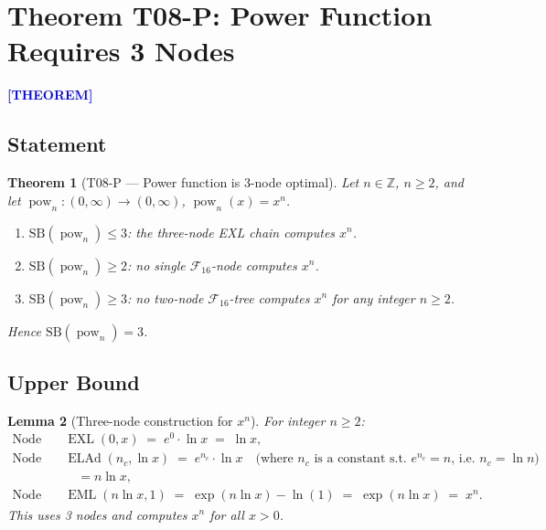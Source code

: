 \documentclass[12pt,a4paper]{article}
\newtheorem{theorem}{Theorem}[section]
\newtheorem{lemma}[theorem]{Lemma}
\theoremstyle{definition}
\newcommand{\EML}{\operatorname{EML}}
\newcommand{\EXL}{\operatorname{EXL}}
\newcommand{\ELAd}{\operatorname{ELAd}}
\newcommand{\prooflabel}[1]{%
  \noindent\textbf{\textcolor{blue}{[#1]}}%
}
\newcommand{\F}{\mathcal{F}_{16}}
\newcommand{\SB}{\mathrm{SB}}
\newcommand{\pow}{\operatorname{pow}}
\begin{document}
\section{\texorpdfstring{%
  Theorem T08-P: Power Function Requires 3 Nodes}{T08-P: Power Lower Bound}}
\label{sec:pow}

\prooflabel{THEOREM}

\subsection{Statement}

\begin{theorem}[T08-P --- Power function is 3-node optimal]\label{thm:pow}
Let $n \in \mathbb{Z}$, $n \geq 2$, and let $\pow_n : (0,\infty) \to (0,\infty)$,
$\pow_n(x) = x^n$.
\begin{enumerate}
  \item[\textup{(i)}]  $\SB(\pow_n) \leq 3$: the three-node EXL chain computes $x^n$.
  \item[\textup{(ii)}] $\SB(\pow_n) \geq 2$: no single $\F$-node computes $x^n$.
  \item[\textup{(iii)}]$\SB(\pow_n) \geq 3$: no two-node $\F$-tree computes $x^n$
        for any integer $n \geq 2$.
\end{enumerate}
Hence $\SB(\pow_n) = 3$.
\end{theorem}

\subsection{Upper Bound}

\begin{lemma}[Three-node construction for $x^n$]\label{lem:pow-upper}
For integer $n\geq 2$:
\begin{align}
  \text{Node 1:}\quad & \EXL(0, x) \;=\; e^0 \cdot \ln x \;=\; \ln x, \label{eq:pow-n1}\\
  \text{Node 2:}\quad & \ELAd(n_c, \ln x) \;=\; e^{n_c} \cdot \ln x
    \quad\text{(where $n_c$ is a constant s.t.\ $e^{n_c}=n$, i.e.\ $n_c=\ln n$)}\\
    & \quad = n\ln x, \nonumber\\
  \text{Node 3:}\quad & \EML(n\ln x, 1) \;=\; \exp(n\ln x) - \ln(1) \;=\; \exp(n\ln x)
    \;=\; x^n. \label{eq:pow-n3}
\end{align}
This uses 3 nodes and computes $x^n$ for all $x>0$.
\end{lemma}
\end{document}
